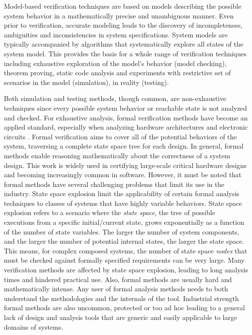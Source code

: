 Model-based verification techniques are based on models describing the possible system behavior in a mathematically precise and unambiguous manner. Even prior to verification, accurate modeling leads to the discovery of incompleteness, ambiguities and inconsistencies in system specifications. System models are typically accompanied by algorithms that systematically explore all states of the system model. This provides the basis for a whole range of verification techniques including exhaustive exploration of the model's behavior (model checking), theorem proving, static code analysis and experiments with restrictive set of scenarios in the model (simulation), in reality (testing). 

Both simulation and testing methods, though common, are non-exhaustive techniques since every possible system behavior or reachable state is not analyzed and checked. For exhaustive analysis, formal verification methods have become an applied standard, especially when analyzing hardware architectures  and electronic circuits \cite{chen1996verification, appenzeller1995formal}. Formal verification aims to cover all of the potential behaviors of the system, traversing a complete state space tree for each design. In general, formal methods enable reasoning mathematically about the correctness of a system design. This work is widely used in certifying large-scale critical hardware designs and becoming increasingly common in software. However, it must be noted that formal methods have several challenging problems that limit its use in the industry. State space explosion limit the applicability of certain formal analysis techniques to classes of systems that have highly variable behaviors. State space explosion refers to a scenario where the \emph{state space}, the tree of possible executions from a specific initial/current state, grows exponentially as a function of the number of state variables. The larger the number of system components, and the larger the number of potential internal states, the larger the state space. This means, for complex composed systems, the number of state space \emph{nodes} that must be checked against formally specified requirements can be very large. Many verification methods are affected by state space explosion, leading to long analysis times and hindered practical use. Also, formal methods are usually hard and mathematically intense. Any user of formal analysis methods needs to both understand the methodologies and the internals of the tool. Industrial strength formal methods are also uncommon, protected or too ad hoc leading to a general lack of design and analysis tools  that are generic and easily applicable to large domains of systems. 

